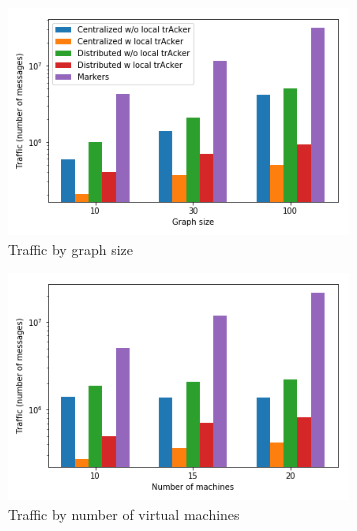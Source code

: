 \begin{figure}[t!]
    \begin{subfigure}[b]{0.32\textwidth}
            \includegraphics[width=0.99\textwidth]{pics/traffic_by_graph_size_bars.png}
            \caption{Traffic by graph size}
            \label{traffic_graph}
    \end{subfigure}
    \hspace{5mm}
    \begin{subfigure}[b]{0.32\textwidth}
            \includegraphics[width=0.99\textwidth]{pics/traffic_by_number_of_machines_bars.png}
            \caption{Traffic by number of virtual machines}
            \label{traffic_machines}
    \end{subfigure}
    \hspace{5mm}
    \begin{subfigure}[b]{0.32\textwidth}

\end{subfigure}
\end{figure}

